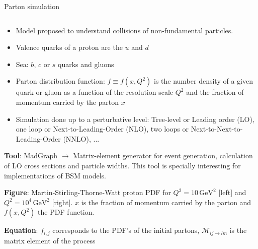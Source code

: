 \begin{frame}{Parton simulation}
\vspace{-.2cm}

\begin{columns}
\begin{column}{.50\textwidth}
  \begin{block}{}\tiny
    \begin{itemize}
    \item Model proposed to understand collisions of non-fundamental particles.
    \item Valence quarks of a proton are the $u$ and $d$
    \item Sea: $b$, $c$ or $s$ quarks and gluons
    \item Parton distribution function: $f\equiv f(x,Q^{2})$ is the number density of a given quark or gluon as a function of the resolution scale $Q^{2}$ and the fraction of momentum carried by the parton $x$
    \item Simulation done up to a perturbative level: Tree-level or Leading order (LO), one loop or Next-to-Leading-Order (NLO), two loops or Next-to-Next-to-Leading-Order (NNLO), ...
    \end{itemize}
  \end{block}
\vspace{-.3cm}
\begin{block}{}\tiny
\textbf{Tool}: MadGraph $\to$ Matrix-element generator for event generation, calculation of LO cross sections and particle widths. This tool is specially interesting for implementations of BSM models.
\end{block}
\vspace{-.3cm}
\begin{block}{}\tiny
\textbf{Figure}: Martin-Stirling-Thorne-Watt proton PDF for $Q^{2}= 10\, \text{GeV}^{2}$ [left] and $Q^{2}= 10^{4}\, \text{GeV}^{2}$ [right]. $x$ is the fraction of momentum carried by the parton and $f(x,Q^{2})$ the PDF function.
\end{block}
\vspace{-.3cm}
\begin{block}{}\tiny
\textbf{Equation}: $f_{i,j}$ corresponds to the PDF's of the initial partons, $\mathcal{M}_{ij\rightarrow lm}$ is the matrix element of the process
\end{block}
\end{column}


\end{columns}
\end{frame}
